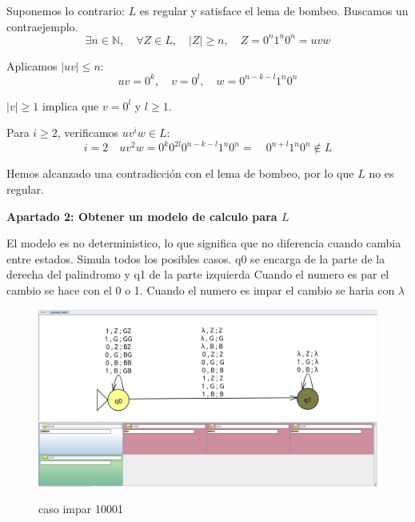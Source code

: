 \documentclass{article}
\begin{document}
        \vspace{\baselineskip} %
        
        
        Suponemos lo contrario: \( L \) es regular y satisface el lema de bombeo. Buscamos un contraejemplo.
        \[ \exists n \in \mathbb{N},\quad \forall Z \in L,\quad |Z| \geq n,\quad Z = 0^n 1^n 0^n = uvw \]
        
        
        Aplicamos \( |uv| \leq n \):
        \[ uv = 0^k, \quad v = 0^l, \quad w = 0^{n-k-l}1^n0^n \]
        
        \( |v| \geq 1 \) implica que \( v = 0^l \) y \( l \geq 1 \).
        \vspace{\baselineskip} %

        Para \( i \geq 2 \), verificamos \( uv^iw \in L \):
        \[ i = 2\quad  uv^2w = 0^k 0^{2l} 0^{n-k-l} 1^n 0^n =\quad 0^{n+l} 1^n 0^n \notin L \]
           
        Hemos alcanzado una contradicción con el lema de bombeo, por lo que \( L \) no es regular.
        
        \vspace{\baselineskip} %

        
        \newpage
        \textbf{Apartado 2: Obtener un modelo de calculo para $L$}         \vspace{\baselineskip} %

         El modelo es no deterministico, lo que significa que no diferencia cuando cambia entre estados. 
         Simula todos los posibles casos.
         q0 se encarga de la parte de la derecha del palindromo y q1 de la parte izquierda 
         Cuando el numero es par el cambio se hace con el 0 o 1. Cuando el numero es impar el cambio se haria con $\lambda$ 
         
        \begin{figure}[!h]
            \centering
            \includegraphics[width=\textwidth]{./Imagenes/image30.png}  
            \label{fig:label4}
            \caption{caso impar 10001}
        \end{figure}
\end{document}
